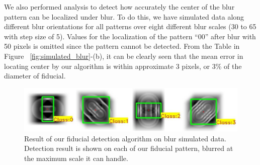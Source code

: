 \documentclass[10pt,twocolumn,letterpaper]{article}
\begin{document}
We also performed analysis to detect how accurately the center of the blur pattern 
can be localized under blur.  To do this, we have simulated data along different blur
orientations for all patterns over eight different blur scales (30 to 65 with
step size of 5). Values for the localization of the pattern ``00'' after blur
with 50 pixels is omitted since the pattern cannot be detected. From the Table in Figure
~\ref{fig:simulated_blur}-(b), it can be clearly seen that the mean error in
locating center by our algorithm is within approximate 3 pixels, or 3\% of the
diameter of fiducial.

\begin{figure}
\includegraphics[width=\linewidth]{blur_maximum.pdf}
\caption{Result of our fiducial detection algorithm on blur simulated data.
Detection result is shown on each of our fiducial pattern, blurred at the
maximum scale it can handle.}
\label{fig:blur_maximum}
\end{figure}
\end{document}
